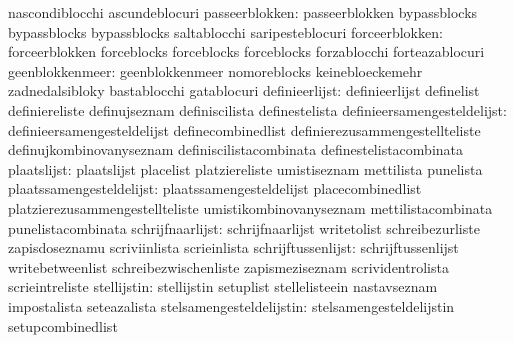                                  nascondiblocchi                  ascundeblocuri
                 passeerblokken:  passeerblokken                   bypassblocks
                                  bypassblocks                     bypassblocks
                                  saltablocchi                     saripesteblocuri
                 forceerblokken:  forceerblokken                   forceblocks
                                  forceblocks                      forceblocks
                                  forzablocchi                     forteazablocuri
                geenblokkenmeer:  geenblokkenmeer                  nomoreblocks
                                  keinebloeckemehr                 zadnedalsibloky
                                  bastablocchi                     gatablocuri
                 definieerlijst:  definieerlijst                   definelist
                                  definiereliste                   definujseznam
                                  definiscilista                   definestelista
    definieersamengesteldelijst:  definieersamengesteldelijst      definecombinedlist
                                  definierezusammengestellteliste  definujkombinovanyseznam
                                  definiscilistacombinata          definestelistacombinata
                    plaatslijst:  plaatslijst                      placelist
                                  platziereliste                   umistiseznam
                                  mettilista                       punelista
       plaatssamengesteldelijst:  plaatssamengesteldelijst         placecombinedlist
                                  platzierezusammengestellteliste  umistikombinovanyseznam
                                  mettilistacombinata              punelistacombinata
               schrijfnaarlijst:  schrijfnaarlijst                 writetolist
                                  schreibezurliste                 zapisdoseznamu
                                  scriviinlista                    scrieinlista
             schrijftussenlijst:  schrijftussenlijst               writebetweenlist
                                  schreibezwischenliste            zapismeziseznam
                                  scrividentrolista                scrieintreliste
                    stellijstin:  stellijstin                      setuplist
                                  stellelisteein                   nastavseznam
                                  impostalista                     seteazalista
       stelsamengesteldelijstin:  stelsamengesteldelijstin         setupcombinedlist
